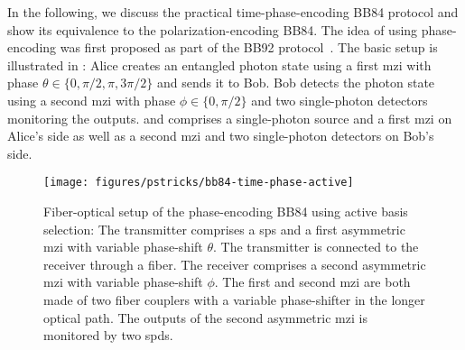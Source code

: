 In the following, we discuss the practical time-phase-encoding BB84 protocol and show its equivalence to the polarization-encoding BB84.
The idea of using phase-encoding was first proposed as part of the BB92 protocol~\cite{Bennett1992}.
The basic setup is illustrated in :
Alice creates an entangled photon state using a first \gls{mzi} with phase $\theta\in\{0,\pi/2,\pi,3\pi/2\}$ and sends it to Bob. Bob detects the photon state using a second \gls{mzi} with phase $\phi\in\{0,\pi/2\}$ and two single-photon detectors monitoring the outputs. and comprises a single-photon source and a first \gls{mzi} on Alice's side as well as a second \gls{mzi} and two single-photon detectors on Bob's side.
\begin{figure}[htb]
	\centering
	\texttt{[image: figures/pstricks/bb84-time-phase-active]}
	\caption{Fiber-optical setup of the phase-encoding BB84 using active basis selection: The transmitter comprises a \gls{sps} and a first asymmetric \gls{mzi} with variable phase-shift $\theta$. The transmitter is connected to the receiver through a fiber. The receiver comprises a second asymmetric \gls{mzi} with variable phase-shift $\phi$. The first and second \gls{mzi} are both made of two fiber couplers with a variable phase-shifter in the longer optical path. The outputs of the second asymmetric \gls{mzi} is monitored by two \gls{spd}s.}\label{fig:qubit_time_phase_active}
\end{figure}

